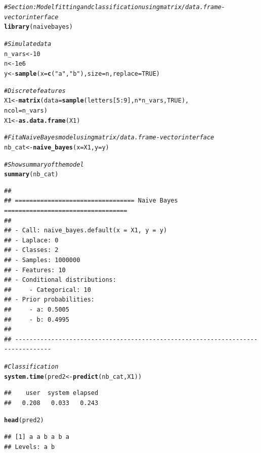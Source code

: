 \documentclass{article}\usepackage[]{graphicx}\usepackage[]{xcolor}
\makeatletter
\newcommand{\hlnum}[1]{\textcolor[rgb]{0.686,0.059,0.569}{#1}}%
\newcommand{\hlstr}[1]{\textcolor[rgb]{0.192,0.494,0.8}{#1}}%
\newcommand{\hlcom}[1]{\textcolor[rgb]{0.678,0.584,0.686}{\textit{#1}}}%
\newcommand{\hlopt}[1]{\textcolor[rgb]{0,0,0}{#1}}%
\newcommand{\hlstd}[1]{\textcolor[rgb]{0.345,0.345,0.345}{#1}}%
\newcommand{\hlkwb}[1]{\textcolor[rgb]{0.69,0.353,0.396}{#1}}%
\newcommand{\hlkwc}[1]{\textcolor[rgb]{0.333,0.667,0.333}{#1}}%
\newcommand{\hlkwd}[1]{\textcolor[rgb]{0.737,0.353,0.396}{\textbf{#1}}}%
\newenvironment{kframe}{%
 \def\at@end@of@kframe{}%
 \ifinner\ifhmode%
  \def\at@end@of@kframe{\end{minipage}}%
  \begin{minipage}{\columnwidth}%
 \fi\fi%
 \def\FrameCommand##1{\hskip\@totalleftmargin \hskip-\fboxsep
 \colorbox{shadecolor}{##1}\hskip-\fboxsep
     \hskip-\linewidth \hskip-\@totalleftmargin \hskip\columnwidth}%
 \MakeFramed {\advance\hsize-\width
   \@totalleftmargin\z@ \linewidth\hsize
   \@setminipage}}%
 {\par\unskip\endMakeFramed%
 \at@end@of@kframe}
\newenvironment{knitrout}{}{} %
\makeatother
\begin{document}
\begin{knitrout}
\color{fgcolor}\begin{kframe}
\begin{alltt}
\hlcom{# Section: Model fitting and classification using matrix/data.frame - vector interface}
\hlkwd{library}\hlstd{(naivebayes)}

\hlcom{# Simulate data}
\hlstd{n_vars} \hlkwb{<-} \hlnum{10}
\hlstd{n} \hlkwb{<-} \hlnum{1e6}
\hlstd{y} \hlkwb{<-} \hlkwd{sample}\hlstd{(}\hlkwc{x} \hlstd{=} \hlkwd{c}\hlstd{(}\hlstr{"a"}\hlstd{,} \hlstr{"b"}\hlstd{),} \hlkwc{size} \hlstd{= n,} \hlkwc{replace} \hlstd{=} \hlnum{TRUE}\hlstd{)}

\hlcom{# Discrete features}
\hlstd{X1} \hlkwb{<-} \hlkwd{matrix}\hlstd{(}\hlkwc{data} \hlstd{=} \hlkwd{sample}\hlstd{(letters[}\hlnum{5}\hlopt{:}\hlnum{9}\hlstd{], n} \hlopt{*} \hlstd{n_vars,} \hlnum{TRUE}\hlstd{),}
             \hlkwc{ncol} \hlstd{= n_vars)}
\hlstd{X1} \hlkwb{<-} \hlkwd{as.data.frame}\hlstd{(X1)}

\hlcom{# Fit a Naive Bayes model using matrix/data.frame - vector interface}
\hlstd{nb_cat} \hlkwb{<-} \hlkwd{naive_bayes}\hlstd{(}\hlkwc{x} \hlstd{= X1,} \hlkwc{y} \hlstd{= y)}

\hlcom{# Show summary of the model}
\hlkwd{summary}\hlstd{(nb_cat)}
\end{alltt}
\begin{verbatim}
## 
## ================================= Naive Bayes ================================== 
##  
## - Call: naive_bayes.default(x = X1, y = y) 
## - Laplace: 0 
## - Classes: 2 
## - Samples: 1000000 
## - Features: 10 
## - Conditional distributions: 
##     - Categorical: 10
## - Prior probabilities: 
##     - a: 0.5005
##     - b: 0.4995
## 
## --------------------------------------------------------------------------------
\end{verbatim}
\begin{alltt}
\hlcom{# Classification}
\hlkwd{system.time}\hlstd{(pred2} \hlkwb{<-} \hlkwd{predict}\hlstd{(nb_cat, X1))}
\end{alltt}
\begin{verbatim}
##    user  system elapsed 
##   0.208   0.033   0.243
\end{verbatim}
\begin{alltt}
\hlkwd{head}\hlstd{(pred2)}
\end{alltt}
\begin{verbatim}
## [1] a a b a b a
## Levels: a b
\end{verbatim}
\end{kframe}
\end{knitrout}
\end{document}
